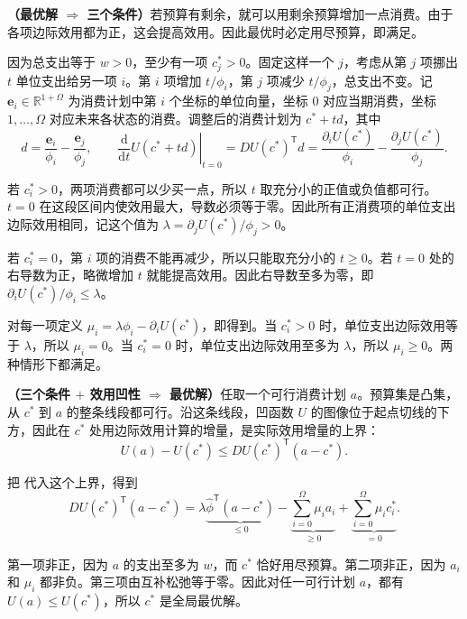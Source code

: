\begin{solution}[label-content={证明},blank-type=none]
\textbf{（最优解 $\Rightarrow$ 三个条件）}若预算有剩余，就可以用剩余预算增加一点消费。由于各项边际效用都为正，这会提高效用。因此最优时必定用尽预算，即满足。

因为总支出等于 $w>0$，至少有一项 $c_j^*>0$。固定这样一个 $j$，考虑从第 $j$ 项挪出 $t$ 单位支出给另一项 $i$。第 $i$ 项增加 $t/\phi_i$，第 $j$ 项减少 $t/\phi_j$，总支出不变。记 $\mathbf e_i\in\mathbb R^{1+\Omega}$ 为消费计划中第 $i$ 个坐标的单位向量，坐标 $0$ 对应当期消费，坐标 $1,\ldots,\Omega$ 对应未来各状态的消费。调整后的消费计划为 $c^*+td$，其中
\[
 d=\frac{\mathbf e_i}{\phi_i}-\frac{\mathbf e_j}{\phi_j},
 \qquad
 \left.\frac{\mathrm d}{\mathrm dt}U(c^*+td)\right|_{t=0}
 =DU(c^*)^{\mathsf T}d
 =\frac{\partial_i U(c^*)}{\phi_i}-\frac{\partial_j U(c^*)}{\phi_j}.
\]

若 $c_i^*>0$，两项消费都可以少买一点，所以 $t$ 取充分小的正值或负值都可行。$t=0$ 在这段区间内使效用最大，导数必须等于零。因此所有正消费项的单位支出边际效用相同，记这个值为 $\lambda=\partial_jU(c^*)/\phi_j>0$。

若 $c_i^*=0$，第 $i$ 项的消费不能再减少，所以只能取充分小的 $t\ge0$。若 $t=0$ 处的右导数为正，略微增加 $t$ 就能提高效用。因此右导数至多为零，即 $\partial_iU(c^*)/\phi_i\le\lambda$。

对每一项定义 $\mu_i=\lambda\phi_i-\partial_iU(c^*)$，即得到。当 $c_i^*>0$ 时，单位支出边际效用等于 $\lambda$，所以 $\mu_i=0$。当 $c_i^*=0$ 时，单位支出边际效用至多为 $\lambda$，所以 $\mu_i\ge0$。两种情形下都满足。

\textbf{（三个条件 $+$ 效用凹性 $\Rightarrow$ 最优解）}任取一个可行消费计划 $a$。预算集是凸集，从 $c^*$ 到 $a$ 的整条线段都可行。沿这条线段，凹函数 $U$ 的图像位于起点切线的下方，因此在 $c^*$ 处用边际效用计算的增量，是实际效用增量的上界：
\[
 U(a)-U(c^*)\le DU(c^*)^{\mathsf T}(a-c^*).
\]

把 代入这个上界，得到
\[
 DU(c^*)^{\mathsf T}(a-c^*)
 =\lambda\underbrace{\hat\phi^{\mathsf T}(a-c^*)}_{\le0}
 -\underbrace{\sum_{i=0}^{\Omega}\mu_i a_i}_{\ge0}
 +\underbrace{\sum_{i=0}^{\Omega}\mu_i c_i^*}_{=0}.
\]

第一项非正，因为 $a$ 的支出至多为 $w$，而 $c^*$ 恰好用尽预算。第二项非正，因为 $a_i$ 和 $\mu_i$ 都非负。第三项由互补松弛等于零。因此对任一可行计划 $a$，都有 $U(a)\le U(c^*)$，所以 $c^*$ 是全局最优解。
\end{solution}

